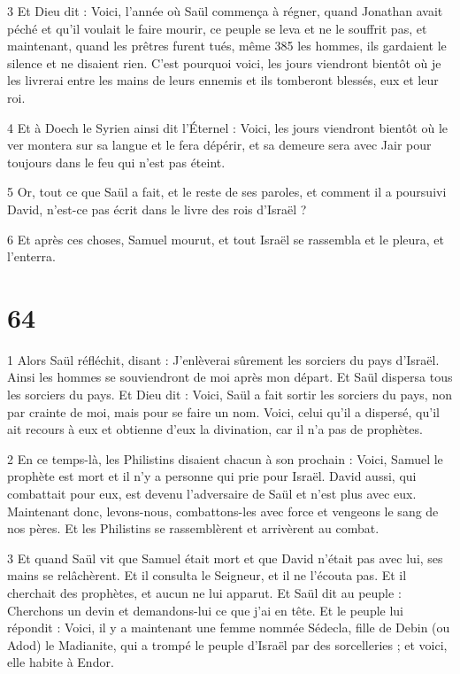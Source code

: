\par 3 Et Dieu dit : Voici, l'année où Saül commença à régner, quand Jonathan avait péché et qu'il voulait le faire mourir, ce peuple se leva et ne le souffrit pas, et maintenant, quand les prêtres furent tués, même 385 les hommes, ils gardaient le silence et ne disaient rien. C'est pourquoi voici, les jours viendront bientôt où je les livrerai entre les mains de leurs ennemis et ils tomberont blessés, eux et leur roi.

\par 4 Et à Doech le Syrien ainsi dit l'Éternel : Voici, les jours viendront bientôt où le ver montera sur sa langue et le fera dépérir, et sa demeure sera avec Jair pour toujours dans le feu qui n'est pas éteint.

\par 5 Or, tout ce que Saül a fait, et le reste de ses paroles, et comment il a poursuivi David, n'est-ce pas écrit dans le livre des rois d'Israël ?

\par 6 Et après ces choses, Samuel mourut, et tout Israël se rassembla et le pleura, et l'enterra.

\chapter{64}

\par 1 Alors Saül réfléchit, disant : J'enlèverai sûrement les sorciers du pays d'Israël. Ainsi les hommes se souviendront de moi après mon départ. Et Saül dispersa tous les sorciers du pays. Et Dieu dit : Voici, Saül a fait sortir les sorciers du pays, non par crainte de moi, mais pour se faire un nom. Voici, celui qu'il a dispersé, qu'il ait recours à eux et obtienne d'eux la divination, car il n'a pas de prophètes.

\par 2 En ce temps-là, les Philistins disaient chacun à son prochain : Voici, Samuel le prophète est mort et il n'y a personne qui prie pour Israël. David aussi, qui combattait pour eux, est devenu l'adversaire de Saül et n'est plus avec eux. Maintenant donc, levons-nous, combattons-les avec force et vengeons le sang de nos pères. Et les Philistins se rassemblèrent et arrivèrent au combat.

\par 3 Et quand Saül vit que Samuel était mort et que David n'était pas avec lui, ses mains se relâchèrent. Et il consulta le Seigneur, et il ne l'écouta pas. Et il cherchait des prophètes, et aucun ne lui apparut. Et Saül dit au peuple : Cherchons un devin et demandons-lui ce que j'ai en tête. Et le peuple lui répondit : Voici, il y a maintenant une femme nommée Sédecla, fille de Debin (ou Adod) le Madianite, qui a trompé le peuple d'Israël par des sorcelleries ; et voici, elle habite à Endor.

